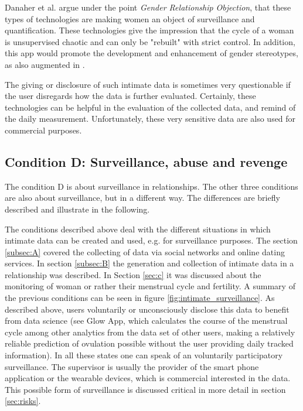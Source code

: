 Danaher et al. \cite{doi:10.1080/15265161.2017.1409823} argue under the point \textit{Gender Relationship Objection}, that these types of technologies are making women an object of surveillance and quantification. 
These technologies give the impression that the cycle of a woman is unsupervised chaotic and can only be "rebuilt" with strict control.
In addition, this app would promote the development and enhancement of gender stereotypes, as also augmented in \cite{doi:10.1080/13691058.2014.920528}.
 
The giving or disclosure of such intimate data is sometimes very questionable if the user disregards how the data is further evaluated. Certainly, these technologies can be helpful in the evaluation of the collected data, and remind of the daily measurement. Unfortunately, these very sensitive data are also used for commercial purposes.

\subsection{Condition D: Surveillance, abuse and revenge}
\label{subsec:D}
The condition D is about surveillance in relationships. The other three conditions are also about surveillance, but in a different way. The differences are briefly described and illustrate in the following.
 
The conditions described above deal with the different situations in which intimate data can be created and used, e.g. for surveillance purposes.
The section \ref{subsec:A} covered the collecting of data via social networks and online dating services. In section \ref{subsec:B} the generation and collection of intimate data in a relationship was described. In Section \ref{sec:c} it was discussed about the monitoring of woman or rather their menstrual cycle and fertility.
A summary of the previous conditions can be seen in figure \ref{fig:intimate_surveillance}.
As described above, users voluntarily or unconsciously disclose this data to benefit from data science (see Glow App, which calculates the course of the menstrual cycle among other analytics from the data set of other users, making a relatively reliable prediction of ovulation possible without the user providing daily tracked information).
In all these states one can speak of an voluntarily participatory surveillance.
The supervisor is usually the provider of the smart phone application or the wearable devices, which is commercial interested in the data. This possible form of surveillance is discussed critical in more detail in section \ref{sec:risks}.

